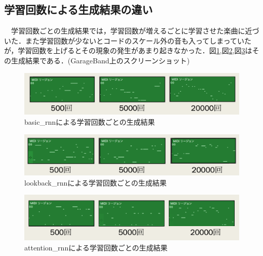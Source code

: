 \subsection{学習回数による生成結果の違い}
　学習回数ごとの生成結果では，学習回数が増えるごとに学習させた楽曲に近づいた．また学習回数が少ないとコードのスケール外の音も入ってしまっていたが，学習回数を上げるとその現象の発生があまり起きなかった．図\ref{fig:basic_rnnによる学習回数ごとの生成結果},図\ref{fig:lookback_rnnによる学習回数ごとの生成結果},図\ref{fig:attention_rnnによる学習回数ごとの生成結果}はその生成結果である．(GarageBand上のスクリーンショット)
\begin{figure}[h]
    \begin{screen}
    \begin{center}
        \includegraphics[scale=0.68, clip]{./img/basicMIDI.png}
        \caption{basic\_rnnによる学習回数ごとの生成結果}
        \label{fig:basic_rnnによる学習回数ごとの生成結果}
    \end{center}
    \end{screen}
\end{figure}
\begin{figure}[h]
    \begin{screen}
    \begin{center}
        \includegraphics[scale=0.68, clip]{./img/lookbackMIDI.png}
        \caption{lookback\_rnnによる学習回数ごとの生成結果}
        \label{fig:lookback_rnnによる学習回数ごとの生成結果}
    \end{center}
    \end{screen}
\end{figure}
\begin{figure}[h]
    \begin{screen}
    \begin{center}
        \includegraphics[scale=0.68, clip]{./img/attentionMIDI.png}
        \caption{attention\_rnnによる学習回数ごとの生成結果}
        \label{fig:attention_rnnによる学習回数ごとの生成結果}
    \end{center}
    \end{screen}
\end{figure}
\newpage
